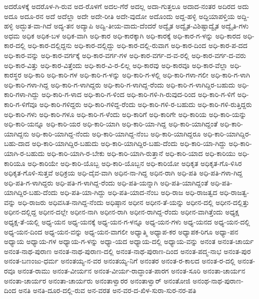 ಅದರೊಳಕ್ಕೆ
ಅದರೊಳ-ಗಿ-ರುವ
ಅದ-ರೊಳಗೆ
ಅದಲ-ಗೆರೆ
ಅದಲ್ಲ
ಅದಾ-ಗುತ್ತಲೂ
ಅದಾದ-ನಂತರ
ಅದಿರದ
ಅದು
ಅದೂ
ಅದೂ-ರನ
ಅದೆ
ಅದೆಲ್ಲಾ
ಅದೇ
ಅದೇ-ರೀತಿ
ಅದೇ-ವುದೋ
ಅದೊಂದು
ಅದ್ದ-ಹಳ್ಳಿ
ಅದ್ದಿಯಾಪಳ್ತಿಯ
ಅದ್ದಿ-ಹಳ್ಳಿ
ಅದ್ಭುತ-ವಾ-ಗಿದೆ
ಅದ್ಯ-ತನ
ಅದ್ಯಾಪಿ
ಅದ್ವಿ-ತೀಯ-ವಾದು-ದೆಂದರೆ
ಅದ್ವೈತ
ಅದ್ವೈತ-ವಿಶಿಷ್ಟಾದ್ವೈತ
ಅದ್ವೈತಿ-ಗಳು
ಅಧಮ
ಅಧಿಕ
ಅಧಿಕ-ಬಳ
ಅಧಿಕ-ವಾಗಿ
ಅಧಿ-ಕಾರ
ಅಧಿ-ಕಾರಕ್ಕಾಗಿ
ಅಧಿ-ಕಾರಕ್ಕೆ
ಅಧಿ-ಕಾರ-ಗ-ಳನ್ನು
ಅಧಿ-ಕಾರದ
ಅಧಿ-ಕಾರ-ದಲ್ಲಿ
ಅಧಿ-ಕಾರ-ದಲ್ಲಿದ್ದನು
ಅಧಿ-ಕಾರ-ದಲ್ಲಿದ್ದು
ಅಧಿ-ಕಾರ-ದಲ್ಲಿ-ರುವಾಗ
ಅಧಿ-ಕಾರ-ದಿಂದ
ಅಧಿ-ಕಾರ-ಪ-ದದ
ಅಧಿ-ಕಾರ-ವನ್ನು
ಅಧಿ-ಕಾರ-ವರ್ಗಕ್ಕೆ
ಅಧಿ-ಕಾರ-ವರ್ಗ-ಗಳ
ಅಧಿ-ಕಾರ-ವರ್ಗ-ದ-ವ-ರಲ್ಲಿ
ಅಧಿ-ಕಾರ-ವರ್ಗ-ದ-ವರು
ಅಧಿ-ಕಾರ-ವಿತ್ತು
ಅಧಿ-ಕಾರ-ವಿತ್ತೆಂದು
ಅಧಿ-ಕಾರ-ವಿ-ರ-ಲಿಲ್ಲ
ಅಧಿ-ಕಾರವು
ಅಧಿ-ಕಾರವೂ
ಅಧಿ-ಕಾರ-ವೆಲ್ಲಾ
ಅಧಿ-ಕಾರಸ್ಥರ
ಅಧಿ-ಕಾರಿ
ಅಧಿ-ಕಾರಿ-ಗಳ
ಅಧಿ-ಕಾರಿ-ಗ-ಳನ್ನು
ಅಧಿ-ಕಾರಿ-ಗ-ಳಲ್ಲಿ
ಅಧಿ-ಕಾರಿ-ಗಳಾ-ಗಲೀ
ಅಧಿ-ಕಾರಿ-ಗ-ಳಾಗಿ
ಅಧಿ-ಕಾರಿ-ಗಳಾ-ಗಿದ್ದ
ಅಧಿ-ಕಾರಿ-ಗ-ಳಾಗಿದ್ದರು
ಅಧಿ-ಕಾರಿ-ಗ-ಳಾಗಿದ್ದ-ರೆಂದು
ಅಧಿ-ಕಾರಿ-ಗ-ಳಾಗಿದ್ದಿರ-ಬಹುದು
ಅಧಿ-ಕಾರಿ-ಗಳಾ-ಗಿದ್ದು
ಅಧಿ-ಕಾರಿ-ಗ-ಳಾದ
ಅಧಿ-ಕಾರಿ-ಗ-ಳಿಂದ
ಅಧಿ-ಕಾರಿ-ಗಳಿ-ಗಿ-ರುವುದ-ರಿಂದ
ಅಧಿ-ಕಾರಿ-ಗ-ಳಿಗೆ
ಅಧಿ-ಕಾರಿ-ಗ-ಳಿಗೆವೂ
ಅಧಿ-ಕಾರಿ-ಗಳಿದ್ದರು
ಅಧಿ-ಕಾರಿ-ಗಳಿದ್ದ-ರೆಂದು
ಅಧಿ-ಕಾರಿ-ಗಳಿ-ರ-ಬಹುದು
ಅಧಿ-ಕಾರಿ-ಗಳಿ-ರುತ್ತಿದ್ದರು
ಅಧಿ-ಕಾರಿ-ಗಳು
ಅಧಿ-ಕಾರಿ-ಗಳೂ
ಅಧಿ-ಕಾರಿ-ಗ-ಳೆಂದು
ಅಧಿ-ಕಾರಿಗೆ
ಅಧಿ-ಕಾರಿಗೇ
ಅಧಿ-ಕಾರಿಯ
ಅಧಿ-ಕಾರಿ-ಯನ್ನು
ಅಧಿ-ಕಾರಿ-ಯನ್ನೂ
ಅಧಿ-ಕಾರಿ-ಯರ
ಅಧಿ-ಕಾರಿ-ಯಾಗಿ
ಅಧಿ-ಕಾರಿ-ಯಾ-ಗಿದ್ದ
ಅಧಿ-ಕಾರಿ-ಯಾಗಿದ್ದಂತೆ
ಅಧಿ-ಕಾರಿ-ಯಾಗಿದ್ದನು
ಅಧಿ-ಕಾರಿ-ಯಾಗಿದ್ದ-ನೆಂದು
ಅಧಿ-ಕಾರಿ-ಯಾಗಿದ್ದ-ನೆಂಬ
ಅಧಿ-ಕಾರಿ-ಯಾಗಿದ್ದರೂ
ಅಧಿ-ಕಾರಿ-ಯಾಗಿದ್ದಿರ-ಬಹು-ದಾದ
ಅಧಿ-ಕಾರಿ-ಯಾಗಿದ್ದಿರ-ಬಹುದು
ಅಧಿ-ಕಾರಿ-ಯಾಗಿದ್ದಿರ-ಬಹು-ದೆಂದು
ಅಧಿ-ಕಾರಿ-ಯಾ-ಗಿದ್ದು
ಅಧಿ-ಕಾರಿ-ಯಾಗಿ-ರ-ಬಹುದು
ಅಧಿ-ಕಾರಿ-ಯಾಗಿ-ರ-ಬೇಕು
ಅಧಿ-ಕಾರಿ-ಯಾಗಿ-ರುತ್ತಾನೆ
ಅಧಿ-ಕಾರಿ-ಯಾದ
ಅಧಿ-ಕಾರಿಯು
ಅಧಿ-ಕಾರಿಯೂ
ಅಧಿ-ಕಾರಿಯೇ
ಅಧಿ-ಕಾರಿ-ಯೊಬ್ಬ
ಅಧಿ-ಕಾರಿ-ಯೊಬ್ಬನ
ಅಧಿ-ಕಾರಿಯೋ
ಅಧಿಕೃತ
ಅಧಿಕೃತ-ಗೊ-ಳಿಸಿರ
ಅಧಿಕೃತ-ಗೊಳಿ-ಸುತ್ತವೆ
ಅಧಿಕ್ರಯ
ಅಧಿ-ದೈವ-ವಾಗಿ
ಅಧಿನ-ನಾ-ಗಿದ್ದ
ಅಧಿನ-ರಾಗಿ
ಅಧಿ-ಪತಿ
ಅಧಿ-ಪತಿ-ಗಳಾ-ಗಿದ್ದ
ಅಧಿ-ಪತಿ-ಗ-ಳಾಗಿದ್ದರು
ಅಧಿ-ಪತಿ-ಗ-ಳಾಗಿದ್ದ-ರೆಂದು
ಅಧಿ-ಪತಿ-ಯನ್ನಾಗಿ
ಅಧಿ-ಪತಿ-ಯಾಗಿದ್ದಂತೆ
ಅಧಿ-ಪತಿ-ಯಾಗಿದ್ದಿರ-ಬಹು-ದೆಂದು
ಅಧಿ-ಪತಿ-ಯಾ-ಗಿದ್ದು
ಅಧಿ-ಪತಿ-ಯಾದ-ನೆಂಬ
ಅಧಿ-ರಾಜ
ಅಧಿ-ರಾಜತ್ವದ
ಅಧಿ-ರಾಜತ್ವ-ವನ್ನು
ಅಧಿ-ರಾಜರು
ಅಧಿವಸಿತ-ನಾಗಿದ್ದ-ನೆಂದು
ಅಧಿಷ್ಠಾನ
ಅಧೀನ
ಅಧೀನ-ತೆ-ಯನ್ನು
ಅಧೀನ-ದಲ್ಲಿ
ಅಧೀನ-ದಲ್ಲಿತ್ತು
ಅಧೀನ-ದಲ್ಲಿದ್ದ
ಅಧೀನ-ದಲ್ಲೇ
ಅಧೀನ-ನಾಗಿ
ಅಧೀನ-ರಾಗಿ
ಅಧೀನ-ರಾಗಿದ್ದ-ರೆಂದು
ಅಧೀನ-ವಾಗಿತ್ತೆಂದು
ಅಧ್ಯಕ್ಷ
ಅಧ್ಯಕ್ಷ-ತೆ-ಯಲ್ಲಿ
ಅಧ್ಯ-ಯನ
ಅಧ್ಯ-ಯನಕ್ಕೆ
ಅಧ್ಯ-ಯನ-ಗ-ಳನ್ನೂ
ಅಧ್ಯ-ಯನ-ಗಳು
ಅಧ್ಯ-ಯನದ
ಅಧ್ಯ-ಯನ-ದಲ್ಲಿ
ಅಧ್ಯ-ಯನ-ದಿಂದ
ಅಧ್ಯ-ಯನ-ವನ್ನು
ಅಧ್ಯ-ಯನ-ವಾಗಲೀ
ಅಧ್ಯಾತ್ಮಿ
ಅಧ್ಯಾಪ-ಕರ
ಅಧ್ಯಾಪಕ-ರಿಗೂ
ಅಧ್ಯಾ-ಪನ
ಅಧ್ಯಾಯ
ಅಧ್ಯಾಯ-ಗಳ
ಅಧ್ಯಾಯ-ಗ-ಳನ್ನು
ಅಧ್ಯಾ-ಯದ
ಅಧ್ಯಾಯ-ದಲ್ಲಿ
ಅಧ್ಯಾಯ-ವನ್ನು
ಅನಂತ
ಅನಂತ-ಚಾರ್ಯ
ಅನಂತ-ನಾಥ-ಪುರಾಣ
ಅನಂತ-ನಾಥ-ಪುರಾಣ-ದಲ್ಲಿ
ಅನಂತ-ನಾಥ-ಪುರಾಣ-ದಿಂದ
ಅನಂತ-ಪದ್ಮ-ನಾಭ
ಅನಂತ-ಪುರ
ಅನಂತ-ಬಣಂಜು-ಧರ್ಮ
ಅನಂತಯ್ಯ-ನ-ವರ
ಅನಂತಯ್ಯ-ನಿಗೆ
ಅನಂತರ
ಅನಂತ-ರ-ಕಾಲದ
ಅನಂತ-ರ-ದಲ್ಲಿ
ಅನಂತ-ರವೂ
ಅನಂತ-ರಾಮು
ಅನಂತ-ವೀರ್ಯನ
ಅನಂತ-ವೀರ್ಯ-ರಾದ್ಧಾಂತ-ಪಾರಗ
ಅನಂತ-ಸೂರಿ
ಅನಂತಾ-ಚಾರ್ಯನ
ಅನಂತಾ-ಚಾರ್ಯರ
ಅನಂತಾ-ಚಾರ್ಯರು
ಅನಂತಾಳ್ವಾರರ
ಅನಂತಾಳ್ವಾರ್
ಅನಂತೋಜಿ
ಅನಂಥ-ನಾಥ-ಪುರಾಣ-ದಿಂದ
ಅನತಿ
ಅನತಿ-ದೂರ-ದಲ್ಲಿ-ರುವ
ಅನ-ವರತ
ಅನ-ವರ-ದ-ಖಿಳ-ಸುರಾ-ಸುರ-ನರ-ಪತಿ
